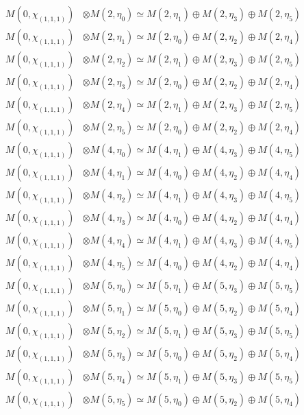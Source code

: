 \begin{align*}
M(0,\chi_{(1,1,1)}) &\otimes M(2,\eta_{0}) \simeq M(2,\eta_{1}) \oplus M(2,\eta_{3}) \oplus M(2,\eta_{5}) \\
M(0,\chi_{(1,1,1)}) &\otimes M(2,\eta_{1}) \simeq M(2,\eta_{0}) \oplus M(2,\eta_{2}) \oplus M(2,\eta_{4}) \\
M(0,\chi_{(1,1,1)}) &\otimes M(2,\eta_{2}) \simeq M(2,\eta_{1}) \oplus M(2,\eta_{3}) \oplus M(2,\eta_{5}) \\
M(0,\chi_{(1,1,1)}) &\otimes M(2,\eta_{3}) \simeq M(2,\eta_{0}) \oplus M(2,\eta_{2}) \oplus M(2,\eta_{4}) \\
M(0,\chi_{(1,1,1)}) &\otimes M(2,\eta_{4}) \simeq M(2,\eta_{1}) \oplus M(2,\eta_{3}) \oplus M(2,\eta_{5}) \\
M(0,\chi_{(1,1,1)}) &\otimes M(2,\eta_{5}) \simeq M(2,\eta_{0}) \oplus M(2,\eta_{2}) \oplus M(2,\eta_{4}) \\
M(0,\chi_{(1,1,1)}) &\otimes M(4,\eta_{0}) \simeq M(4,\eta_{1}) \oplus M(4,\eta_{3}) \oplus M(4,\eta_{5}) \\
M(0,\chi_{(1,1,1)}) &\otimes M(4,\eta_{1}) \simeq M(4,\eta_{0}) \oplus M(4,\eta_{2}) \oplus M(4,\eta_{4}) \\
M(0,\chi_{(1,1,1)}) &\otimes M(4,\eta_{2}) \simeq M(4,\eta_{1}) \oplus M(4,\eta_{3}) \oplus M(4,\eta_{5}) \\
M(0,\chi_{(1,1,1)}) &\otimes M(4,\eta_{3}) \simeq M(4,\eta_{0}) \oplus M(4,\eta_{2}) \oplus M(4,\eta_{4}) \\
M(0,\chi_{(1,1,1)}) &\otimes M(4,\eta_{4}) \simeq M(4,\eta_{1}) \oplus M(4,\eta_{3}) \oplus M(4,\eta_{5}) \\
M(0,\chi_{(1,1,1)}) &\otimes M(4,\eta_{5}) \simeq M(4,\eta_{0}) \oplus M(4,\eta_{2}) \oplus M(4,\eta_{4}) \\
M(0,\chi_{(1,1,1)}) &\otimes M(5,\eta_{0}) \simeq M(5,\eta_{1}) \oplus M(5,\eta_{3}) \oplus M(5,\eta_{5}) \\
M(0,\chi_{(1,1,1)}) &\otimes M(5,\eta_{1}) \simeq M(5,\eta_{0}) \oplus M(5,\eta_{2}) \oplus M(5,\eta_{4}) \\
M(0,\chi_{(1,1,1)}) &\otimes M(5,\eta_{2}) \simeq M(5,\eta_{1}) \oplus M(5,\eta_{3}) \oplus M(5,\eta_{5}) \\
M(0,\chi_{(1,1,1)}) &\otimes M(5,\eta_{3}) \simeq M(5,\eta_{0}) \oplus M(5,\eta_{2}) \oplus M(5,\eta_{4}) \\
M(0,\chi_{(1,1,1)}) &\otimes M(5,\eta_{4}) \simeq M(5,\eta_{1}) \oplus M(5,\eta_{3}) \oplus M(5,\eta_{5}) \\
M(0,\chi_{(1,1,1)}) &\otimes M(5,\eta_{5}) \simeq M(5,\eta_{0}) \oplus M(5,\eta_{2}) \oplus M(5,\eta_{4}) \\
\end{align*}

